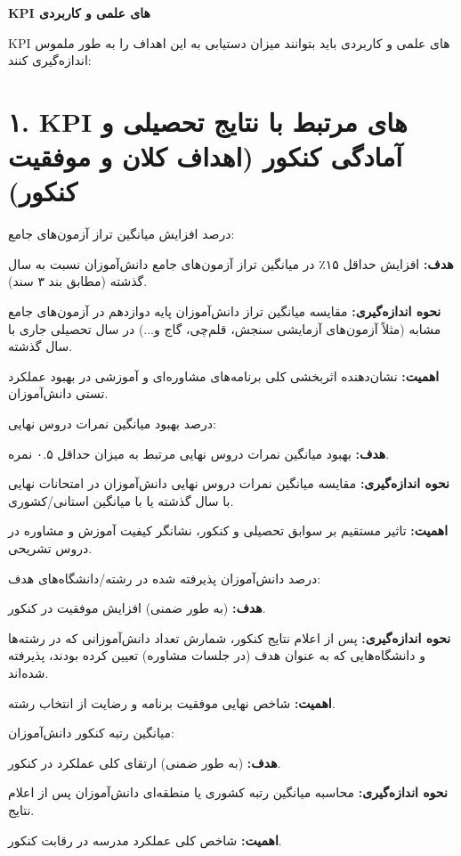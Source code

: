 \documentclass[12pt,a4paper]{article}
\newcommand{\kpiitem}[1]{\par\textbf{#1}}
\begin{document}
\onehalfspacing %

\begin{center}
    \Large\textbf{KPI های علمی و کاربردی}
\end{center}
\vspace{1em}

KPI های علمی و کاربردی باید بتوانند میزان دستیابی به این اهداف را به طور ملموس اندازه‌گیری کنند:

\vspace{1em}
\hrulefill
\vspace{1em}

\section*{۱. KPI های مرتبط با نتایج تحصیلی و آمادگی کنکور (اهداف کلان و موفقیت کنکور)}

 درصد افزایش میانگین تراز آزمون‌های جامع:
\kpiitem{هدف:} افزایش حداقل ۱۵٪ در میانگین تراز آزمون‌های جامع دانش‌آموزان نسبت به سال گذشته (مطابق بند ۳ سند).
\kpiitem{نحوه اندازه‌گیری:} مقایسه میانگین تراز دانش‌آموزان پایه دوازدهم در آزمون‌های جامع مشابه (مثلاً آزمون‌های آزمایشی سنجش، قلم‌چی، گاج و...) در سال تحصیلی جاری با سال گذشته.
\kpiitem{اهمیت:} نشان‌دهنده اثربخشی کلی برنامه‌های مشاوره‌ای و آموزشی در بهبود عملکرد تستی دانش‌آموزان.

\vspace{1em}
 درصد بهبود میانگین نمرات دروس نهایی:
\kpiitem{هدف:} بهبود میانگین نمرات دروس نهایی مرتبط به میزان حداقل ۰.۵ نمره.
\kpiitem{نحوه اندازه‌گیری:} مقایسه میانگین نمرات دروس نهایی دانش‌آموزان در امتحانات نهایی با سال گذشته یا با میانگین استانی/کشوری.
\kpiitem{اهمیت:} تاثیر مستقیم بر سوابق تحصیلی و کنکور، نشانگر کیفیت آموزش و مشاوره در دروس تشریحی.

\vspace{1em}
 درصد دانش‌آموزان پذیرفته شده در رشته/دانشگاه‌های هدف:
\kpiitem{هدف:} (به طور ضمنی) افزایش موفقیت در کنکور.
\kpiitem{نحوه اندازه‌گیری:} پس از اعلام نتایج کنکور، شمارش تعداد دانش‌آموزانی که در رشته‌ها و دانشگاه‌هایی که به عنوان هدف (در جلسات مشاوره) تعیین کرده بودند، پذیرفته شده‌اند.
\kpiitem{اهمیت:} شاخص نهایی موفقیت برنامه و رضایت از انتخاب رشته.

\vspace{1em}
 میانگین رتبه کنکور دانش‌آموزان:
\kpiitem{هدف:} (به طور ضمنی) ارتقای کلی عملکرد در کنکور.
\kpiitem{نحوه اندازه‌گیری:} محاسبه میانگین رتبه کشوری یا منطقه‌ای دانش‌آموزان پس از اعلام نتایج.
\kpiitem{اهمیت:} شاخص کلی عملکرد مدرسه در رقابت کنکور.
\end{document}
